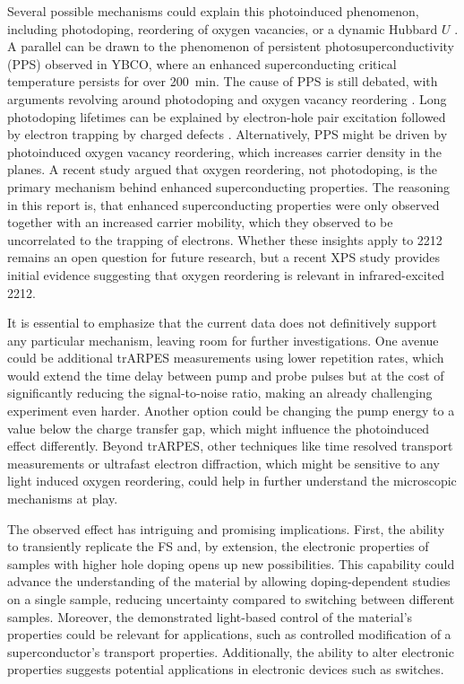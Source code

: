 Several possible mechanisms could explain this photoinduced phenomenon, including photodoping, reordering of oxygen vacancies, or a dynamic Hubbard $U$ \cite{baykusheva_ultrafast_2022}.
A parallel can be drawn to the phenomenon of persistent photosuperconductivity (PPS) observed in YBCO, where an enhanced superconducting critical temperature persists for over \qty{200}{\minute}.
The cause of PPS is still debated, with arguments revolving around photodoping and oxygen vacancy reordering \cite{gilabert_photodoping_2000}.
Long photodoping lifetimes can be explained by electron-hole pair excitation followed by electron trapping by charged defects \cite{el_hage_disentangling_2024, kudinov_persistent_1993, kudinov_mechanisms_1994}.
Alternatively, PPS might be driven by photoinduced oxygen vacancy reordering, which increases carrier density in the  planes.
A recent study \cite{el_hage_disentangling_2024} argued that oxygen reordering, not photodoping, is the primary mechanism behind enhanced superconducting properties.
The reasoning in this report is, that enhanced superconducting properties were only observed together with an increased carrier mobility, which they observed to be uncorrelated to the trapping of electrons.
Whether these insights apply to 2212 remains an open question for future research, but a recent XPS study \cite{puntel_out--equilibrium_2024} provides initial evidence suggesting that oxygen reordering is relevant in infrared-excited 2212.

It is essential to emphasize that the current data does not definitively support any particular mechanism, leaving room for further investigations.
One avenue could be additional trARPES measurements using lower repetition rates, which would extend the time delay between pump and probe pulses but at the cost of significantly reducing the signal-to-noise ratio, making an already challenging experiment even harder.
Another option could be changing the pump energy to a value below the charge transfer gap, which might influence the photoinduced effect differently.
Beyond trARPES, other techniques like time resolved transport measurements or ultrafast electron diffraction, which might be sensitive to any light induced oxygen reordering, could help in further understand the microscopic mechanisms at play.

The observed effect has intriguing and promising implications.
First, the ability to transiently replicate the FS and, by extension, the electronic properties of samples with higher hole doping opens up new possibilities.
This capability could advance the understanding of the material by allowing doping-dependent studies on a single sample, reducing uncertainty compared to switching between different samples.
Moreover, the demonstrated light-based control of the material's properties could be relevant for applications, such as controlled modification of a superconductor’s transport properties.
Additionally, the ability to alter electronic properties suggests potential applications in electronic devices such as switches.


